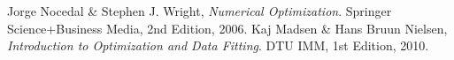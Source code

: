 \begin{thebibliography}{9}

  Jorge Nocedal \& Stephen J. Wright,
  \emph{Numerical Optimization}.
  Springer Science+Business Media,
  2nd Edition,
  2006.
  Kaj Madsen \& Hans Bruun Nielsen,
  \emph{Introduction to Optimization and Data Fitting}.
  DTU IMM,
  1st Edition,
  2010.

\end{thebibliography}
